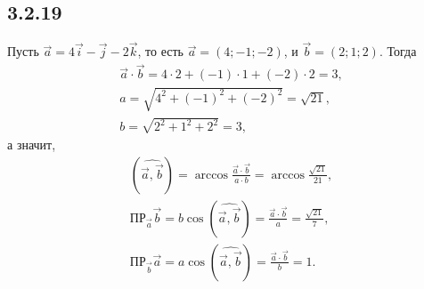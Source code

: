 \subsection{3.2.19}

Пусть $\vec a=4\vec i-\vec j-2\vec k$, то есть $\vec a=(4;-1;-2)$, и $\vec b=(2;1;2)$. Тогда
\begin{gather*}
\vec a\cdot\vec b=4\cdot2+(-1)\cdot1+(-2)\cdot2=3, \\
a=\sqrt{4^2+(-1)^2+(-2)^2}=\sqrt{21}, \\
b=\sqrt{2^2+1^2+2^2}=3,
\end{gather*}
а значит,
\begin{gather*}
\left(\widehat{\vec a,\vec b}\right)=\arccos\frac{\vec a\cdot\vec b}{a\cdot b}=\arccos\frac{\sqrt{21}}{21}, \\
\text{ПР}_{\vec a}\vec b=b\cos\left(\widehat{\vec a,\vec b}\right)=\frac{\vec a\cdot\vec b}{a}=\frac{\sqrt{21}}{7}, \\
\text{ПР}_{\vec b}\vec a=a\cos\left(\widehat{\vec a,\vec b}\right)=\frac{\vec a\cdot\vec b}{b}=1.
\end{gather*}
